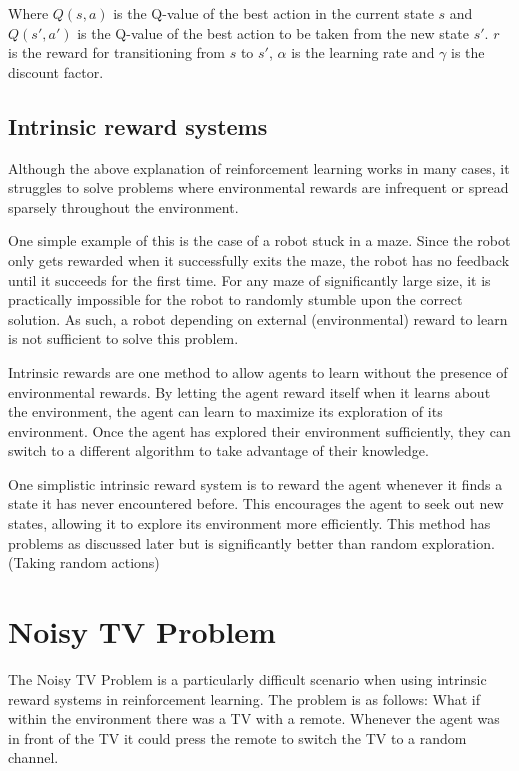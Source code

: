 \documentclass[12pt]{thesis}
\begin{document}
Where $Q(s,a)$ is the Q-value of the best action in the current state $s$ and $Q(s',a')$ is the Q-value of the best action to be taken from the new state $s'$. $r$ is the reward for transitioning from $s$ to $s'$, $\alpha$ is the learning rate and $\gamma$ is the discount factor.

\subsection{Intrinsic reward systems}
Although the above explanation of reinforcement learning works in many cases, it struggles to solve problems where environmental rewards are infrequent or spread sparsely throughout the environment. \cite{DBLP:journals/corr/abs-1908-06976}

One simple example of this is the case of a robot stuck in a maze. Since the robot only gets rewarded when it successfully exits the maze, the robot has no feedback until it succeeds for the first time. For any maze of significantly large size, it is practically impossible for the robot to randomly stumble upon the correct solution. As such, a robot depending on external (environmental) reward to learn is not sufficient to solve this problem.

Intrinsic rewards are one method to allow agents to learn without the presence of environmental rewards. By letting the agent reward itself when it learns about the environment, the agent can learn to maximize its exploration of its environment. Once the agent has explored their environment sufficiently, they can switch to a different algorithm to take advantage of their knowledge. \cite{Rein:VIME}

One simplistic intrinsic reward system is to reward the agent whenever it finds a state it has never encountered before.  \cite{DBLP:journals/corr/TangHFSCDSTA16} This encourages the agent to seek out new states, allowing it to explore its environment more efficiently. This method has problems as discussed later but is significantly better than random exploration. (Taking random actions)

\section{Noisy TV Problem}
The Noisy TV Problem is a particularly difficult scenario when using intrinsic reward systems in reinforcement learning. \cite{DBLP:journals/corr/abs-2008-04388} The problem is as follows: What if within the environment there was a TV with a remote. Whenever the agent was in front of the TV it could press the remote to switch the TV to a random channel.
\end{document}
